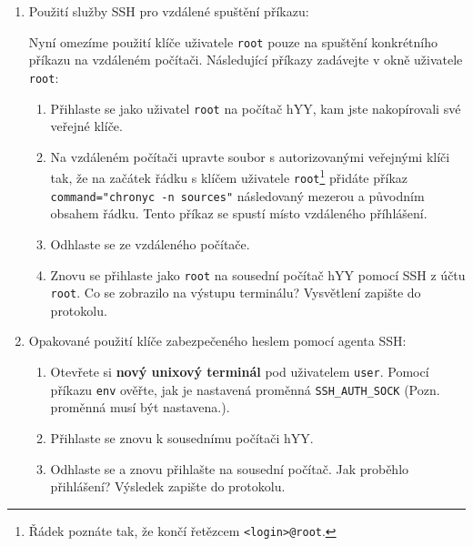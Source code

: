 \documentclass[a4paper,11pt]{article}
\begin{document}
\begin{enumerate}
  \item Použití služby SSH pro vzdálené spuštění příkazu:
    
    Nyní omezíme použití klíče uživatele {\tt root} pouze na spuštění konkrétního příkazu na vzdáleném počítači. Následující příkazy zadávejte v okně uživatele {\tt root}:
    \begin{enumerate}
    \item Přihlaste se jako uživatel {\tt root} na počítač hYY, kam jste nakopírovali své veřejné klíče.
    \item Na vzdáleném počítači upravte soubor s autorizovanými veřejnými klíči tak, že na začátek řádku s klíčem uživatele {\tt root}\footnote{Řádek poznáte tak, že končí řetězcem {\tt <login>@root}.} přidáte příkaz 
        \verb|command="chronyc -n sources"| následova\-ný mezerou a původním obsahem řádku. Tento příkaz se spustí místo vzdáleného příhlášení. 
      \item Odhlaste se ze vzdáleného počítače.
      \item Znovu se přihlaste jako {\tt root} na sousední počítač hYY pomocí SSH z účtu {\tt root}. 
      Co se zobrazilo na výstupu terminálu? Vysvětlení zapište do protokolu.
    \end{enumerate}
  \item Opakované použití klíče zabezpečeného heslem pomocí agenta SSH:
    \begin{enumerate}
      \item Otevřete si \textbf{nový unixový terminál} pod uživatelem {\tt user}. Pomocí příkazu \verb|env| ověřte, jak je nastavená proměnná \verb|SSH_AUTH_SOCK| (Pozn. proměnná musí být nastavena.).
      \item Přihlaste se znovu k sousednímu počítači hYY.
      \item Odhlaste se a znovu přihlašte na sousední počítač. Jak proběhlo přihlášení? Výsledek zapište do protokolu.
    \end{enumerate}
\end{enumerate}
\end{document}
